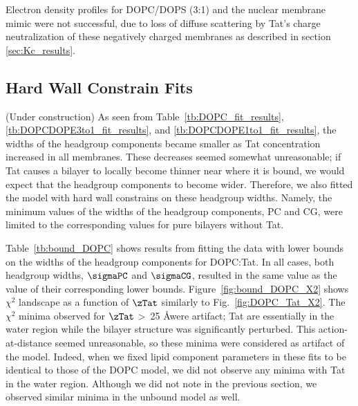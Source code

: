 Electron density profiles for DOPC/DOPS (3:1) and the nuclear membrane 
mimic were not
successful, due to loss of diffuse scattering by Tat’s charge neutralization 
of these negatively
charged membranes as described in section \ref{sec:Kc_results}.

\subsection{Hard Wall Constrain Fits}\label{sec:bound_results}
(Under construction)
As seen from Table~\ref{tb:DOPC_fit_results}, \ref{tb:DOPCDOPE3to1_fit_results},
and \ref{tb:DOPCDOPE1to1_fit_results}, the widths of the headgroup components
became smaller as Tat concentration increased in all membranes. These 
decreases seemed somewhat unreasonable; if Tat causes a bilayer 
to locally become thinner near where it is bound, 
we would expect that the headgroup components to become
wider. Therefore, we also fitted the model with hard wall constrains
on these headgroup widths. Namely, the minimum values of the widths of
the headgroup components, PC and CG, were limited to the corresponding 
values for pure bilayers without Tat. 

Table~\ref{tb:bound_DOPC} shows results from fitting the data with
lower bounds on the widths of the headgroup components for DOPC:Tat.
In all cases, both headgroup widths, $\sigmaPC$ and $\sigmaCG$, resulted 
in the same value as the value of their corresponding lower bounds. 
Figure~\ref{fig:bound_DOPC_X2} shows $\chi^2$ landscape as a function of
$\zTat$ similarly to Fig.~\ref{fig:DOPC_Tat_X2}. The $\chi^2$ minima 
observed for $\zTat$ \textgreater\ 25 \AA were artifact; Tat are essentially in
the water region while the bilayer structure was significantly perturbed.
This action-at-distance seemed unreasonable, so these minima were considered
as artifact of the model. 
Indeed, when we fixed lipid component parameters in these fits to be identical to those of 
the DOPC model, we did not observe any minima with Tat in the water region.
Although we did not note in the previous section,
we observed similar minima in the unbound model as well.

